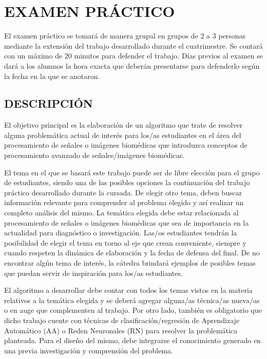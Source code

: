 \documentclass[10pt]{article}
\begin{document}
\newpage
\section*{EXAMEN PRÁCTICO}

El examen práctico se tomará de manera grupal en grupos de 2 a 3 personas mediante la extensión del trabajo desarrollado durante el cuatrimestre. Se contará con un máximo de 20 minutos para defender el trabajo. Días previos al examen se dará a los alumnos la hora exacta que deberán presentarse para defenderlo según la fecha en la que se anotaron.
\vspace{0.25cm}

\subsection*{DESCRIPCIÓN}

El objetivo principal es la elaboración de un algoritmo que trate de resolver alguna problemática actual de interés para los/as estudiantes en el área del procesamiento de señales o imágenes biomédicas que introduzca conceptos de procesamiento avanzado de señales/imágenes biomédicas. 
\vspace{0.25cm}

El tema en el que se basará este trabajo puede ser de libre elección para el grupo de estudiantes, siendo una de las posibles opciones la continuación del trabajo práctico desarrollado durante la cursada. De elegir otro tema, deben buscar información relevante para comprender al problema elegido y así realizar un completo análisis del mismo. La temática elegida debe estar relacionada al procesamiento de señales o imágenes biomédicas que sea de importancia en la actualidad para diagnóstico o investigación. Las/os estudiantes tendrán la posibilidad de elegir el tema en torno al eje que crean conveniente, siempre y cuando respeten la dinámica de elaboración y la fecha de defensa del final. De no encontrar algún tema de interés, la cátedra brindará ejemplos de posibles temas que puedan servir de inspiración para los/as estudiantes. 
\vspace{0.25cm}

El algoritmo a desarrollar debe contar con todos los temas vistos en la materia relativos a la temática elegida y se deberá agregar alguna/as técnica/as nueva/as o en auge que complementen al trabajo. Por otro lado, también es obligatorio que dicho trabajo cuente con técnicas de clasificación/regresión de Aprendizaje Automático (AA) o Reden Neuronales (RN) para resolver la problemática planteada. Para el diseño del mismo, debe integrarse el conocimiento generado en una previa investigación y comprensión del problema.
\vspace{0.25cm}
\end{document}
